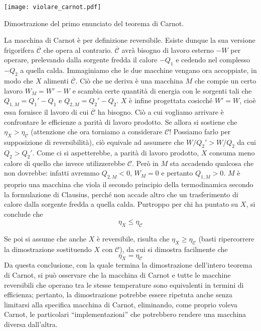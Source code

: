 \begin{marginfigure}
    \centering
    \texttt{[image: violare\_carnot.pdf]}
    \caption{Dimostrazione del primo enunciato del teorema di
    Carnot.}
    \label{teo_carnot}
\end{marginfigure}

La macchina di Carnot è per definizione reversibile. Esiste dunque
la sua versione frigorifera $\overline{\mathcal{C}}$ che opera al contrario.
$\overline{\mathcal{C}}$ avrà bisogno di lavoro esterno $-W$ per operare,
prelevando dalla sorgente fredda il calore $-Q_1$ e cedendo nel
complesso $-Q_2$ a quella calda. Immaginiamo che le due macchine
vengano ora accoppiate, in modo che $X$ alimenti $\overline{\mathcal{C}}$.
Ciò che ne deriva è una macchina $M$ che compie un certo lavoro
$W_M = W' - W$ e scambia certe quantità di energia con le sorgenti
tali che $Q_{1,M} = Q_1'-Q_1$ e $Q_{2,M} = Q_2' - Q_2$. $X$ è infine
progettata cosicché $W' = W$, cioè essa fornisce il lavoro di cui
$\overline{\mathcal{C}}$ ha bisogno. Ciò a cui vogliamo arrivare è
confrontare le efficienze a parità di lavoro prodotto.
Se allora si sostiene che $\eta_X > \eta_\mathcal{C}$ (attenzione che
ora torniamo a considerare $\mathcal{C}$! Possiamo farlo per supposizione
di reversibilità), ciò equivale
ad assumere che $W/Q_2' > W/Q_2$ da cui $Q_2 > Q_2'$. Come ci si
aspetterebbe, a parità di lavoro prodotto, $X$ consuma meno calore di
quello che invece utilizzerebbe $\mathcal{C}$.
Però in $M$ sta accadendo qualcosa che non dovrebbe: infatti
avremmo $Q_{2,M} < 0$, $W_M = 0$ e pertanto $Q_{1,M} > 0$. $M$ è proprio
una macchina che viola il secondo principio della
termodinamica secondo la formulazione di Clausius, perché non accade
altro che un trasferimento di calore dalla sorgente fredda a quella calda.
Purtroppo per chi ha puntato su $X$, si conclude che \[ \eta_X \leq \eta_\mathcal{C} \]

Se poi si assume che anche $X$ è reversibile, risulta che
$\eta_X \geq \eta_\mathcal{C}$ (basti ripercorrere la dimostrazione
sostituendo $X$ con $\mathcal{C}$), da cui si dimostra facilmente
che \[ \eta_X = \eta_\mathcal{C} \] Da questa conclusione, con
la quale termina la dimostrazione dell'intero teorema di Carnot,
si può osservare che la macchina di Carnot e tutte le macchine
reversibili che operano tra le stesse temperature sono equivalenti
in termini di efficienza; pertanto, la dimostrazione potrebbe essere
ripetuta anche senza limitarsi alla specifica macchina di Carnot,
eliminando, come proprio voleva Carnot, le particolari ``implementazioni''
che potrebbero rendere una macchina diversa dall'altra.


